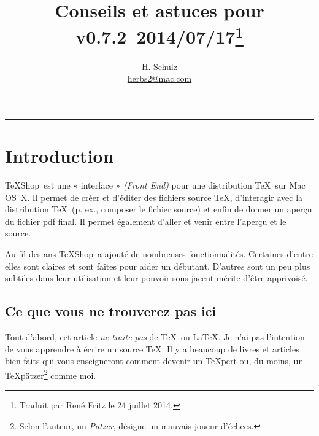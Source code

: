 \documentclass[11pt,french]{article}
\title{Conseils et astuces pour \TS\\\small v0.7.2--2014/07/17\thanks{Traduit par René Fritz le 24 juillet 2014.}}
\author{H. Schulz\\\small\href{mailto:herbs2@mac.com}{herbs2@mac.com}}
\date{}
\newcommand{\TS}{\textsf{\TeX Shop}}
\newcommand{\acr}[1]{\textsf{#1}}
\begin{document}
\maketitle

\tableofcontents

\begin{center}
\rule{0.5\textwidth}{1pt}
\end{center}

\section{Introduction}

\TS\ est une « interface » \emph{(Front End)} pour une distribution \TeX\ sur Mac OS~X. Il permet de créer et d'éditer des fichiers source \TeX{}, d'interagir avec la distribution \TeX\ (p. ex., composer le fichier source) et enfin de donner un aperçu du fichier \acr{pdf} final. Il permet également d'aller et venir entre l'aperçu et le source.


Au fil des ans \TS\ a ajouté de nombreuses fonctionnalités. Certaines d'entre elles sont claires et sont faites pour aider un débutant. D'autres sont un peu plus subtiles dans leur utilisation et leur pouvoir sous-jacent mérite d'être apprivoisé.


\subsection{Ce que vous ne trouverez pas ici}

Tout d'abord, cet article \emph{ne traite pas} de \TeX\ ou \LaTeX. Je n'ai pas l'intention de vous apprendre à écrire un source \TeX{}. Il y a beaucoup de livres et articles bien faits qui vous enseigneront comment devenir un \TeX pert ou, du moins, un \TeX pätzer\footnote{Selon l'auteur, un \emph{Pätzer}, désigne un mauvais joueur d'échecs.} comme moi.
 
\end{document}
